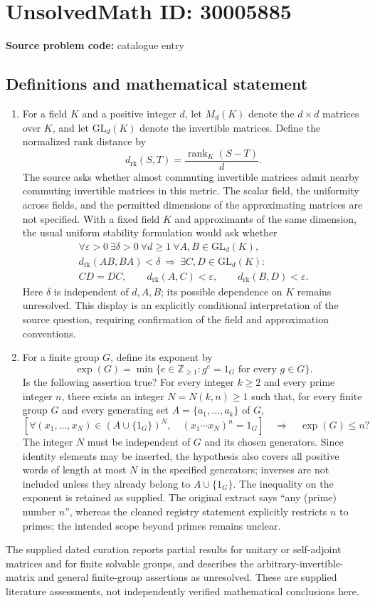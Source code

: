 \documentclass[11pt]{article}
\newcommand{\Z}{\mathbb{Z}}
\begin{document}
\section*{UnsolvedMath ID: 30005885}
\textbf{Source problem code:} catalogue entry
\subsection{Definitions and mathematical statement}
\begin{enumerate}
\item For a field \(K\) and a positive integer \(d\), let \(M_d(K)\) denote the \(d\times d\) matrices over \(K\), and let \(\mathrm{GL}_d(K)\) denote the invertible matrices. Define the normalized rank distance by
\[
 d_{\mathrm{rk}}(S,T)=\frac{\operatorname{rank}_K(S-T)}{d}.
\]
The source asks whether almost commuting invertible matrices admit nearby commuting invertible matrices in this metric. The scalar field, the uniformity across fields, and the permitted dimensions of the approximating matrices are not specified. With a fixed field \(K\) and approximants of the same dimension, the usual uniform stability formulation would ask whether
\[
\begin{gathered}
\forall\varepsilon>0\ \exists\delta>0\ \forall d\geq1\ \forall A,B\in\mathrm{GL}_d(K),\\
 d_{\mathrm{rk}}(AB,BA)<\delta
 \ \Longrightarrow\ 
 \exists C,D\in\mathrm{GL}_d(K):\\
 CD=DC,\qquad
 d_{\mathrm{rk}}(A,C)<\varepsilon,\qquad
 d_{\mathrm{rk}}(B,D)<\varepsilon.
\end{gathered}
\]
Here \(\delta\) is independent of \(d,A,B\); its possible dependence on \(K\) remains unresolved. This display is an explicitly conditional interpretation of the source question, requiring confirmation of the field and approximation conventions.

\item For a finite group \(G\), define its exponent by
\[
\exp(G)=\min\{e\in\Z_{\geq1}:g^e=1_G\text{ for every }g\in G\}.
\]
Is the following assertion true? For every integer \(k\geq2\) and every prime integer \(n\), there exists an integer \(N=N(k,n)\geq1\) such that, for every finite group \(G\) and every generating set \(A=\{a_1,\ldots,a_k\}\) of \(G\),
\[
\left[
 \forall(x_1,\ldots,x_N)\in(A\cup\{1_G\})^N,
 \quad (x_1\cdots x_N)^n=1_G
\right]
\quad\Longrightarrow\quad
\exp(G)\leq n?
\]
The integer \(N\) must be independent of \(G\) and its chosen generators. Since identity elements may be inserted, the hypothesis also covers all positive words of length at most \(N\) in the specified generators; inverses are not included unless they already belong to \(A\cup\{1_G\}\). The inequality on the exponent is retained as supplied. The original extract says ``any (prime) number \(n\)'', whereas the cleaned registry statement explicitly restricts \(n\) to primes; the intended scope beyond primes remains unclear.
\end{enumerate}
The supplied dated curation reports partial results for unitary or self-adjoint matrices and for finite solvable groups, and describes the arbitrary-invertible-matrix and general finite-group assertions as unresolved. These are supplied literature assessments, not independently verified mathematical conclusions here.
\end{document}

